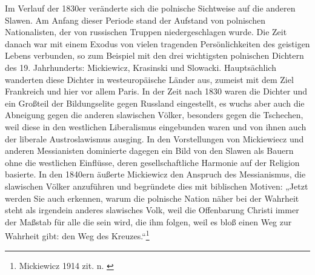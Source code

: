 \documentclass[12pt,headsepline,a4paper]{scrartcl}
\begin{document}
Im Verlauf der 1830er veränderte sich die polnische Sichtweise auf die anderen Slawen. Am
Anfang dieser Periode stand der Aufstand von polnischen Nationalisten, der von russischen
Truppen niedergeschlagen wurde. Die Zeit danach war mit einem Exodus von vielen
tragenden Persönlichkeiten des geistigen Lebens verbunden, so zum Beispiel mit den drei
wichtigsten polnischen Dichtern des 19. Jahrhunderts: Mickiewicz, Krasinski und Slowacki.
Hauptsächlich wanderten diese Dichter in westeuropäische Länder aus, zumeist mit dem Ziel
Frankreich und hier vor allem Paris. In der Zeit nach 1830 waren die Dichter und ein Großteil
der Bildungselite gegen Russland eingestellt\autocite[252]{falkovic}, es wuchs aber auch
die Abneigung gegen die anderen slawischen Völker, besonders gegen die Tschechen, weil
diese in den westlichen Liberalismus eingebunden waren und von ihnen auch der liberale
Austroslawismus ausging. In den Vorstellungen von Mickiewiecz und anderen Messianisten
dominierte dagegen ein Bild von den Slawen als Bauern ohne die westlichen Einflüsse, deren
gesellschaftliche Harmonie auf der Religion basierte\autocite[50]{kohn}. In den 1840ern
äußerte Mickiewicz den Anspruch des Messianismus, die slawischen Völker anzuführen und
begründete dies mit biblischen Motiven: „Jetzt werden Sie auch erkennen, warum die
polnische Nation näher bei der Wahrheit steht als irgendein anderes slawisches Volk, weil die
Offenbarung Christi immer der Maßstab für alle die sein wird, die ihm folgen, weil es bloß
einen Weg zur Wahrheit gibt: den Weg des Kreuzes.“\footnote{Mickiewicz 1914 zit. n. \autocite[54]{kohn}} 
\end{document}
